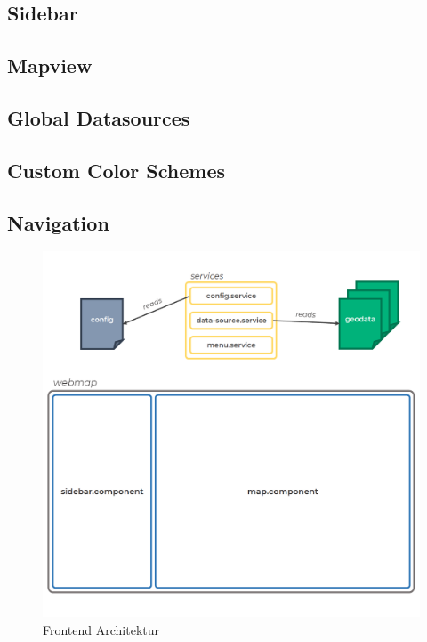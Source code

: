 \subsection{Sidebar}

\subsection{Mapview}

\subsection{Global Datasources}

\subsection{Custom Color Schemes}

\subsection{Navigation}

\begin{figure}[hbt!]
    \centering
    \includegraphics[scale=.6]{pics/frontend-architecture}
    \caption{Frontend Architektur}
    \label{fig:frontend-architecture}
\end{figure}